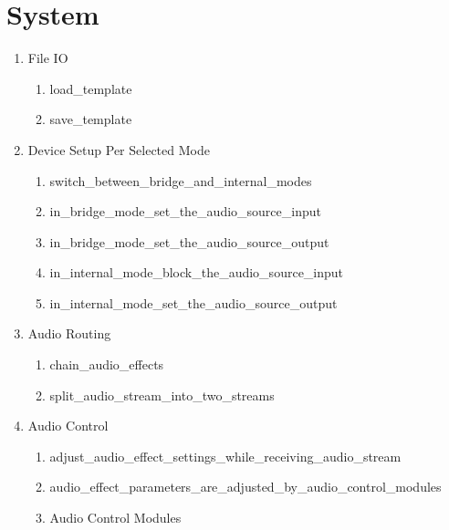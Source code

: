 \section{System}

\begin{enumerate}
	\item File IO
	\begin{enumerate}
		\item load\_template
		\item save\_template
	\end{enumerate}

	\item Device Setup Per Selected Mode
	\begin{enumerate}
		\item switch\_between\_bridge\_and\_internal\_modes
		\item in\_bridge\_mode\_set\_the\_audio\_source\_input
		\item in\_bridge\_mode\_set\_the\_audio\_source\_output
		\item in\_internal\_mode\_block\_the\_audio\_source\_input
		\item in\_internal\_mode\_set\_the\_audio\_source\_output
	\end{enumerate}


	\item Audio Routing
	\begin{enumerate}
		\item chain\_audio\_effects
		\item split\_audio\_stream\_into\_two\_streams

	\end{enumerate}

	\item Audio Control
	\begin{enumerate}
		\item adjust\_audio\_effect\_settings\_while\_receiving\_audio\_stream
		\item audio\_effect\_parameters\_are\_adjusted\_by\_audio\_control\_modules
		\item Audio Control Modules
	\end{enumerate}





\end{enumerate}